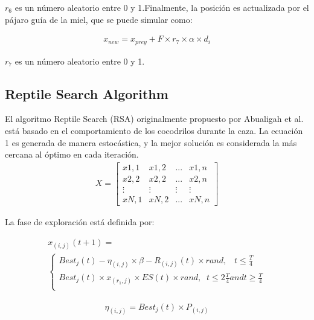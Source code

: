 \documentclass[conference]{IEEEtran}
\begin{document}
$r_6$ es un número aleatorio entre 0 y 1.Finalmente, la posición es actualizada por el pájaro guía de la miel, que se puede simular como:

\begin{equation}
\begin{gathered}
x_{new}=x_{prey}+F\times r_7\times \alpha \times d_i
\end{gathered}
\label{eq32}
\end{equation}

$r_7$ es un número aleatorio entre 0 y 1.

\subsection{Reptile Search Algorithm}

El algoritmo Reptile Search (RSA) originalmente propuesto por Abualigah et al.~\cite{Abualigah2022} está basado en el comportamiento de los cocodrilos durante la caza. 
La ecuación 1 es generada de manera estocástica, y la mejor solución es considerada la más cercana al óptimo en cada iteración.
\begin{equation}
\begin{gathered}
X= \begin{bmatrix}
  x1,1 & x1,2 & ... & x1,n  \\
  x2,2 & x2,2 & ... & x2,n  \\
  \vdots & \vdots & \vdots & \vdots \\
  xN,1 & xN,2 & ... & xN,n
\end{bmatrix}
\end{gathered}
\label{eq33}
\end{equation}

La fase de exploración está definida por:

\begin{equation}
\begin{gathered}
x_{(i,j)}(t+1)=\\
\begin{cases}
Best_j (t) - \eta_{(i,j)}\times \beta-R_{(i,j)}(t)\times rand, \; \; \; t \leq \frac{T}{4} \\
Best_j (t) \times x_{(r_1,j)} \times ES(t) \times rand, \; \; t \leq 2\frac{T}{4} and t \geq \frac{T}{4} \\
\end{cases}
\end{gathered}
\label{eq34}
\end{equation}   

\begin{equation}
\begin{gathered}
\eta_{(i,j)}=Best_j(t)\times P_{(i,j)}
\end{gathered}
\label{eq35}
\end{equation}
\end{document}
